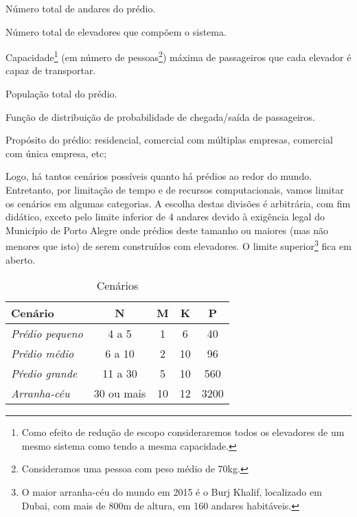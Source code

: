 \begin{description}[leftmargin=!,labelwidth=\widthof{\bfseries Propósito}]
  \item[N]
  Número total de andares do prédio.
  \item[M]
  Número total de elevadores que compõem o sistema.
  \item[K]
  Capacidade\footnote{Como efeito de redução de escopo consideraremos todos os
    elevadores de um mesmo sistema como tendo a mesma capacidade.} (em número de
  pessoas\footnote{Consideramos uma pessoa com peso médio de 70kg.}) máxima de passageiros que cada elevador é capaz de transportar.
  \item[P]
  População total do prédio.
  \item[F]
  Função de distribuição de probabilidade de chegada/saída de passageiros.
  \item[Propósito]
  Propósito do prédio: residencial, comercial com múltiplas empresas, comercial com única empresa, etc;
\end{description}

Logo, há tantos cenários possíveis quanto há prédios ao redor do mundo.
Entretanto, por limitação de tempo e de recursos computacionais, vamos limitar
os cenários em algumas categorias. A escolha destas divisões é arbitrária, com
fim didático, exceto pelo limite inferior de 4 andares devido à exigência legal
do Município de Porto Alegre onde prédios deste tamanho ou maiores (mas não
menores que isto) de serem construídos com elevadores. O limite
superior\footnote{O maior arranha-céu do mundo em 2015 é o Burj Khalif,
  localizado em Dubai, com mais de 800m de altura, em 160 andares habitáveis.} fica em aberto.


\begin{table}[htb!]
\centering
\caption{Cenários}
\label{table:tab1}
\begin{tabular}{|l|c|c|c|c|}
\hline
{\bf Cenário}        & {\bf N}    & {\bf M} & {\bf K} & {\bf P} \\ \hline
{\it Prédio pequeno} & 4 a 5      & 1       & 6       & 40      \\ \hline
{\it Prédio médio}   & 6 a 10     & 2       & 10      & 96      \\ \hline
{\it Pŕedio grande}  & 11 a 30    & 5       & 10      & 560     \\ \hline
{\it Arranha-céu}    & 30 ou mais & 10      & 12      & 3200    \\ \hline
\end{tabular}
\end{table}

